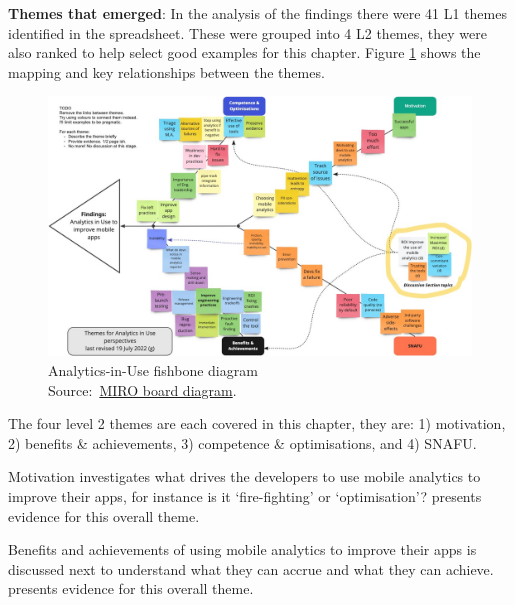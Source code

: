 \textbf{Themes that emerged}: 
%
In the analysis of the findings there were 41 L1 themes identified in the spreadsheet. These were grouped into  4 L2 themes, they were also ranked to help select good examples for this chapter. Figure \ref{fig:analytics-in-use-fishbone-diagram} shows the mapping and key relationships between the themes.

\begin{figure}
    \centering
    \includegraphics[width=\textwidth]{images/rough-sketches/analytics-in-use-fishbone-diagram-19-jul-2022g.jpeg}
    \caption{Analytics-in-Use fishbone diagram\\Source:~\href{https://miro.com/app/board/uXjVOlelPDU=/?share_link_id=219460632025}{MIRO board diagram}.}
    \label{fig:analytics-in-use-fishbone-diagram}
\end{figure}

The four level 2 themes are each covered in this chapter, they are: 1) motivation, 2) benefits \& achievements, 3) competence \& optimisations, and 4) SNAFU.

Motivation investigates what drives the developers to use mobile analytics to improve their apps, for instance is it `fire-fighting' or `optimisation'?  presents evidence for this overall theme.

Benefits and achievements of using mobile analytics to improve their apps is discussed next to understand what they can accrue and what they can achieve.  presents evidence for this overall theme.

